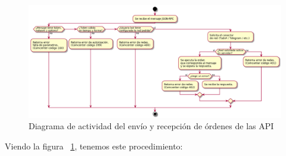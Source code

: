 \documentclass[spanish,12pt, a4paper, twoside]{paper}
\begin{document}
\begin{figure}[hp]
\centering
	\includegraphics[width=\textwidth]{recursos/activity}
\caption{Diagrama de actividad del envío y recepción de órdenes de las API}
\label{fig:DActividad envío recepción órdenes}
\end{figure}

Viendo la figura ~\ref{fig:DActividad envío recepción órdenes}, tenemos este procedimiento:
\end{document}
